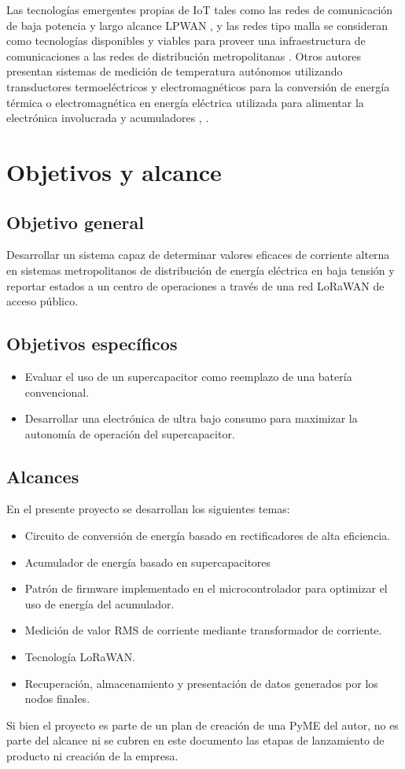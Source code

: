 Las tecnologías emergentes propias de IoT tales como las redes de comunicación de baja potencia y largo alcance LPWAN \citep{rfc8376}, y las redes tipo malla se consideran como tecnologías disponibles y viables para proveer una infraestructura de comunicaciones a las redes de distribución metropolitanas  \citep{ARTICLE:4}. Otros autores presentan sistemas de medición de temperatura autónomos utilizando transductores termoeléctricos y electromagnéticos para la conversión de energía térmica o electromagnética en energía eléctrica utilizada para alimentar la electrónica involucrada y acumuladores \citep{ARTICLE:5}, \citep{Hua}.


\section{Objetivos y alcance}
\subsection{Objetivo general}
Desarrollar un sistema capaz de determinar valores eficaces de corriente alterna en sistemas metropolitanos de distribución de energía eléctrica en baja tensión y reportar estados a un centro de operaciones a través de una red LoRaWAN de acceso público.\\
\subsection{Objetivos específicos}
\begin{itemize}
	\item Evaluar el uso de un supercapacitor como reemplazo de una batería convencional.\\
	\item Desarrollar una electrónica de ultra bajo consumo para maximizar la autonomía de operación del supercapacitor.
\end{itemize}
\subsection{Alcances}
En el presente proyecto se desarrollan los siguientes temas:
\begin{itemize}
	\item Circuito de conversión de energía  basado en rectificadores de alta eficiencia.
	\item Acumulador de energía basado en supercapacitores
	\item Patrón de firmware implementado en el microcontrolador para optimizar el uso de energía del acumulador.
	\item Medición de valor RMS de corriente mediante transformador de corriente.
	\item Tecnología LoRaWAN.
	\item Recuperación, almacenamiento y presentación de datos generados por los nodos finales.
\end{itemize}
Si bien el proyecto es parte de un plan de creación de una PyME del autor, no es parte del alcance ni se cubren en este documento las etapas de lanzamiento de producto ni creación de la empresa.
